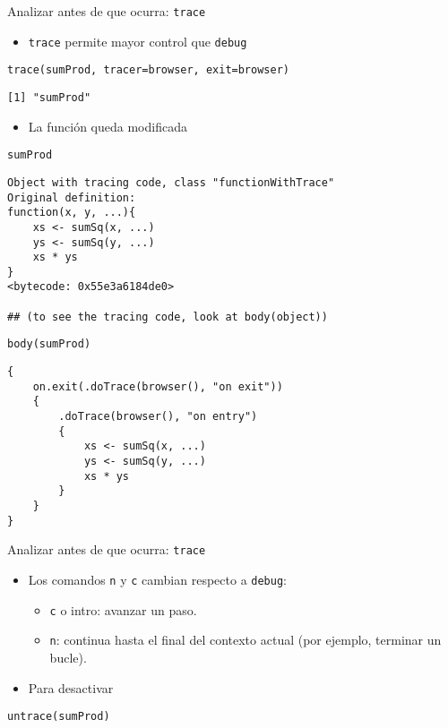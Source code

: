 \documentclass[xcolor={usenames,svgnames,dvipsnames}]{beamer}
\begin{document}
\begin{frame}[label={sec:org0fc576c},fragile]{Analizar antes de que ocurra: \texttt{trace}}
 \begin{itemize}
\item \texttt{trace} permite mayor control que \texttt{debug}
\end{itemize}
\lstset{language=r,label= ,caption= ,captionpos=b,numbers=none}
\begin{lstlisting}
trace(sumProd, tracer=browser, exit=browser)
\end{lstlisting}

\begin{verbatim}
[1] "sumProd"
\end{verbatim}


\begin{itemize}
\item La función queda modificada
\end{itemize}
\lstset{language=r,label= ,caption= ,captionpos=b,numbers=none}
\begin{lstlisting}
sumProd
\end{lstlisting}

\begin{verbatim}
Object with tracing code, class "functionWithTrace"
Original definition: 
function(x, y, ...){
    xs <- sumSq(x, ...)
    ys <- sumSq(y, ...)
    xs * ys
}
<bytecode: 0x55e3a6184de0>

## (to see the tracing code, look at body(object))
\end{verbatim}

\lstset{language=r,label= ,caption= ,captionpos=b,numbers=none}
\begin{lstlisting}
body(sumProd)
\end{lstlisting}

\begin{verbatim}
{
    on.exit(.doTrace(browser(), "on exit"))
    {
        .doTrace(browser(), "on entry")
        {
            xs <- sumSq(x, ...)
            ys <- sumSq(y, ...)
            xs * ys
        }
    }
}
\end{verbatim}
\end{frame}

\begin{frame}[label={sec:orgfa381fd},fragile]{Analizar antes de que ocurra: \texttt{trace}}
 \begin{itemize}
\item Los comandos \texttt{n} y \texttt{c} cambian respecto a \texttt{debug}:
\begin{itemize}
\item \texttt{c} o intro: avanzar un paso.
\item \texttt{n}: continua hasta el final del contexto actual (por ejemplo,
terminar un bucle).
\end{itemize}
\item Para desactivar
\end{itemize}
\lstset{language=r,label= ,caption= ,captionpos=b,numbers=none}
\begin{lstlisting}
untrace(sumProd)
\end{lstlisting}
\end{frame}
\end{document}
